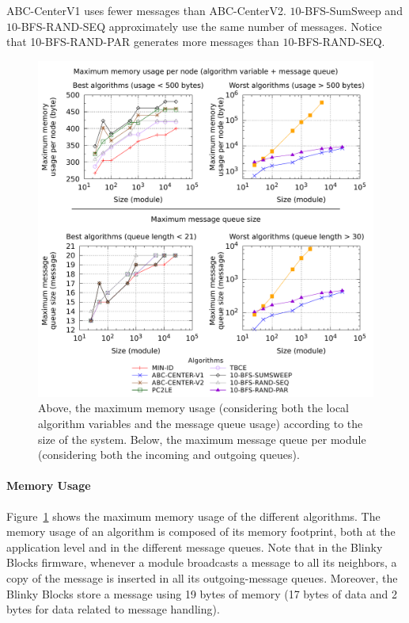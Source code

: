 ABC-CenterV1 uses fewer messages than ABC-CenterV2. $10$-BFS-SumSweep and $10$-BFS-RAND-SEQ approximately use the same number of messages. Notice that 10-BFS-RAND-PAR generates more messages than $10$-BFS-RAND-SEQ.
 
\begin{figure}[!h]
	\centering
	\includegraphics[width=0.9\linewidth]{images/centrality/memory-queue}
	\caption{Above, the maximum memory usage (considering both the local algorithm variables and the message queue usage) according to the size of the system. Below, the maximum message queue per module (considering both the incoming and outgoing queues).\label{fig:centrality:memory-queue}}
\end{figure}

\paragraph{Memory Usage}

Figure~\ref{fig:centrality:memory-queue} shows the maximum memory usage of the different algorithms. The memory usage of an algorithm is composed of its memory footprint, both at the application level and in the different message queues. Note that in the Blinky Blocks firmware, whenever a module broadcasts a message to all its neighbors, a copy of the message is inserted in all its outgoing-message queues. Moreover, the Blinky Blocks store a message using 19 bytes of memory (17 bytes of data and 2 bytes for data related to message handling).

